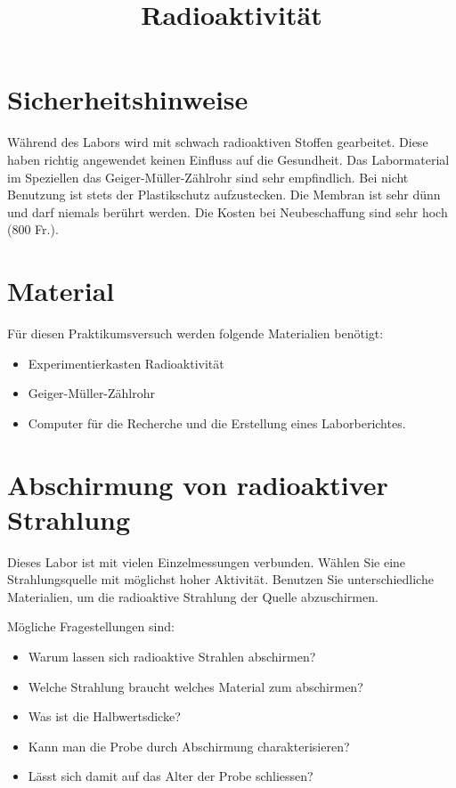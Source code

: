 \documentclass[12pt,a4paper, twosite]{article}
\author{}
\date{}
\title{Radioaktivität}
\begin{document}
\maketitle

\section*{Sicherheitshinweise}
Während des Labors wird mit schwach radioaktiven Stoffen gearbeitet. Diese haben richtig angewendet keinen Einfluss auf
die Gesundheit. Das Labormaterial im Speziellen das Geiger-Müller-Zählrohr sind sehr empfindlich.
Bei nicht Benutzung ist stets der Plastikschutz aufzustecken. Die Membran ist sehr dünn und darf niemals berührt werden.
Die Kosten bei Neubeschaffung sind sehr hoch (800 Fr.).

\section*{Material}
Für diesen Praktikumsversuch werden folgende Materialien benötigt:
\begin{itemize}
	\item Experimentierkasten Radioaktivität 
	\item Geiger-Müller-Zählrohr
	\item Computer für die Recherche und die Erstellung eines Laborberichtes.
\end{itemize}



\section*{Abschirmung von radioaktiver Strahlung}
Dieses Labor ist mit vielen Einzelmessungen verbunden.
Wählen Sie eine Strahlungsquelle mit möglichst hoher Aktivität.
Benutzen Sie unterschiedliche Materialien, um die radioaktive Strahlung der Quelle abzuschirmen. 

Mögliche Fragestellungen sind:
\begin{itemize}
	\item Warum lassen sich radioaktive Strahlen abschirmen?
	\item Welche Strahlung braucht welches Material zum abschirmen?
	\item Was ist die Halbwertsdicke?
	\item Kann man die Probe durch Abschirmung charakterisieren?
	\item Lässt sich damit auf das Alter der Probe schliessen?
\end{itemize}
\end{document}

